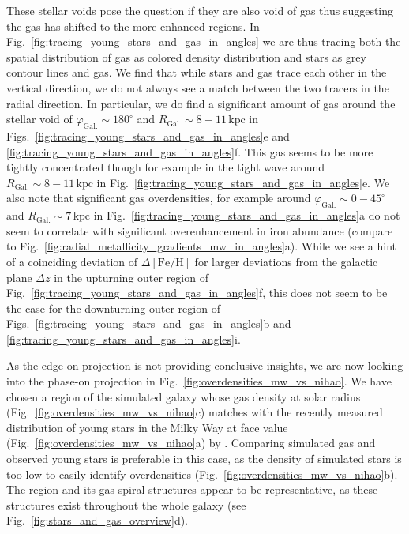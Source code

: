 \documentclass[twocolumn,apj,numberedappendix,appendixfloats,twocolappendix]{openjournal}
\begin{document}
\begin{CJK*}{UTF8}{gbsn}
These stellar voids pose the question if they are also void of gas thus suggesting the gas has shifted to the more enhanced regions. In Fig.~\ref{fig:tracing_young_stars_and_gas_in_angles} we are thus tracing both the spatial distribution of gas as colored density distribution and stars as grey contour lines and gas. We find that while stars and gas trace each other in the vertical direction, we do not always see a match between the two tracers in the radial direction. In particular, we do find a significant amount of gas around the stellar void of $\varphi_\mathrm{Gal.} \sim 180^\circ$ and ${R_\mathrm{Gal.} \sim 8-11\,\mathrm{kpc}}$ in Figs.~\ref{fig:tracing_young_stars_and_gas_in_angles}e and \ref{fig:tracing_young_stars_and_gas_in_angles}f. This gas seems to be more tightly concentrated though for example in the tight wave around $R_\mathrm{Gal.} \sim 8-11\,\mathrm{kpc}$ in Fig.~\ref{fig:tracing_young_stars_and_gas_in_angles}e. We also note that significant gas overdensities, for example around $\varphi_\mathrm{Gal.} \sim 0-45^\circ$ and $R_\mathrm{Gal.} \sim 7\,\mathrm{kpc}$ in Fig.~\ref{fig:tracing_young_stars_and_gas_in_angles}a do not seem to correlate with significant overenhancement in iron abundance (compare to Fig.~\ref{fig:radial_metallicity_gradients_mw_in_angles}a). While we see a hint of a coinciding deviation of $\Delta\mathrm{[Fe/H]}$ for larger deviations from the galactic plane $\Delta z$ in the upturning outer region of Fig.~\ref{fig:tracing_young_stars_and_gas_in_angles}f, this does not seem to be the case for the downturning outer region of Figs.~\ref{fig:tracing_young_stars_and_gas_in_angles}b and \ref{fig:tracing_young_stars_and_gas_in_angles}i.

As the edge-on projection is not providing conclusive insights, we are now looking into the phase-on projection in Fig.~\ref{fig:overdensities_mw_vs_nihao}. We have chosen a region of the simulated galaxy whose gas density at solar radius (Fig.~\ref{fig:overdensities_mw_vs_nihao}c) matches with the recently measured distribution of young stars in the Milky Way at face value (Fig.~\ref{fig:overdensities_mw_vs_nihao}a) by \citet{Poggio2021}. Comparing simulated gas and observed young stars is preferable in this case, as the density of simulated stars is too low to easily identify overdensities (Fig.~\ref{fig:overdensities_mw_vs_nihao}b). The region and its gas spiral structures appear to be representative, as these structures exist throughout the whole galaxy (see Fig.~\ref{fig:stars_and_gas_overview}d).


\end{CJK*}
\end{document}

